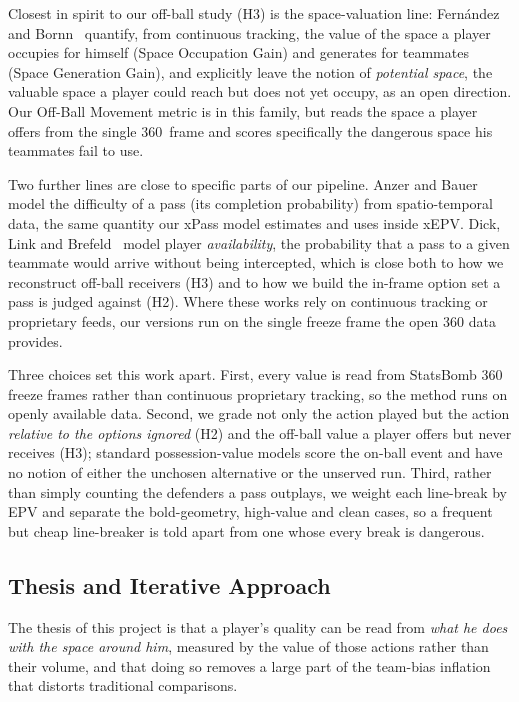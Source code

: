 \documentclass[12pt,a4paper]{article}
\begin{document}
Closest in spirit to our off-ball study (H3) is the space-valuation line: Fern\'{a}ndez and Bornn~\cite{wideopenspaces} quantify, from continuous tracking, the value of the space a player occupies for himself (Space Occupation Gain) and generates for teammates (Space Generation Gain), and explicitly leave the notion of \emph{potential space}, the valuable space a player could reach but does not yet occupy, as an open direction. Our Off-Ball Movement metric is in this family, but reads the space a player offers from the single 360~frame and scores specifically the dangerous space his teammates fail to use.

Two further lines are close to specific parts of our pipeline. Anzer and Bauer~\cite{xpasspaper} model the difficulty of a pass (its completion probability) from spatio-temporal data, the same quantity our xPass model estimates and uses inside xEPV. Dick, Link and Brefeld~\cite{availability} model player \emph{availability}, the probability that a pass to a given teammate would arrive without being intercepted, which is close both to how we reconstruct off-ball receivers (H3) and to how we build the in-frame option set a pass is judged against (H2). Where these works rely on continuous tracking or proprietary feeds, our versions run on the single freeze frame the open 360 data provides.

Three choices set this work apart. First, every value is read from StatsBomb 360 freeze frames rather than continuous proprietary tracking, so the method runs on openly available data. Second, we grade not only the action played but the action \emph{relative to the options ignored} (H2) and the off-ball value a player offers but never receives (H3); standard possession-value models score the on-ball event and have no notion of either the unchosen alternative or the unserved run. Third, rather than simply counting the defenders a pass outplays, we weight each line-break by EPV and separate the bold-geometry, high-value and clean cases, so a frequent but cheap line-breaker is told apart from one whose every break is dangerous.

\subsection{Thesis and Iterative Approach}\label{sec:thesis}

The thesis of this project is that a player's quality can be read from \emph{what he does with the space around him}, measured by the value of those actions rather than their volume, and that doing so removes a large part of the team-bias inflation that distorts traditional comparisons.
\end{document}
